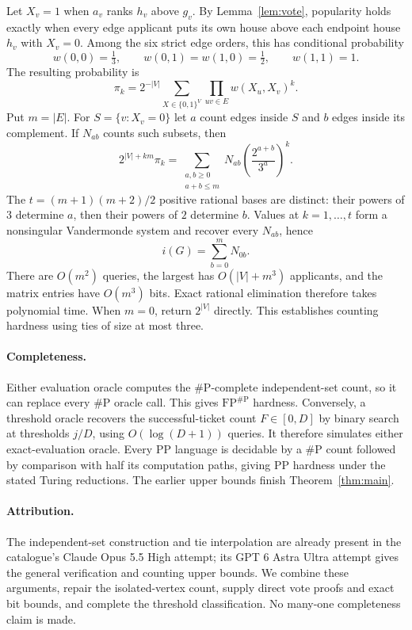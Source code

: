 \documentclass[11pt]{article}
\newcommand{\PP}{\mathrm{PP}}
\newcommand{\FP}{\mathrm{FP}}
\newcommand{\sharpP}{\#\mathrm P}
\begin{document}
Let $X_v=1$ when $a_v$ ranks $h_v$ above $g_v$. By Lemma~\ref{lem:vote}, popularity holds exactly when every edge applicant puts its own house above each endpoint house $h_v$ with $X_v=0$. Among the six strict edge orders, this has conditional probability
\[
 w(0,0)=\tfrac13,\qquad w(0,1)=w(1,0)=\tfrac12,
 \qquad w(1,1)=1.
\]
The resulting probability is
\begin{equation}\label{eq:spin}
 \pi_k=2^{-|V|}\sum_{X\in\{0,1\}^V}\prod_{uv\in E}w(X_u,X_v)^k.
\end{equation}
Put $m=|E|$. For $S=\{v:X_v=0\}$ let $a$ count edges inside $S$ and $b$ edges inside its complement. If $N_{ab}$ counts such subsets, then
\begin{equation}\label{eq:interp}
 2^{|V|+km}\pi_k
 =\sum_{\substack{a,b\geq0\\a+b\leq m}}
 N_{ab}\left(\frac{2^{a+b}}{3^a}\right)^k.
\end{equation}
The $t=(m+1)(m+2)/2$ positive rational bases are distinct: their powers of $3$ determine $a$, then their powers of $2$ determine $b$. Values at $k=1,\ldots,t$ form a nonsingular Vandermonde system and recover every $N_{ab}$, hence
\[
 i(G)=\sum_{b=0}^m N_{0b}.
\]
There are $O(m^2)$ queries, the largest has $O(|V|+m^3)$ applicants, and the matrix entries have $O(m^3)$ bits. Exact rational elimination therefore takes polynomial time. When $m=0$, return $2^{|V|}$ directly. This establishes counting hardness using ties of size at most three.

\paragraph{Completeness.}
Either evaluation oracle computes the $\sharpP$-complete independent-set count, so it can replace every $\sharpP$ oracle call. This gives $\FP^{\sharpP}$ hardness. Conversely, a threshold oracle recovers the successful-ticket count $F\in[0,D]$ by binary search at thresholds $j/D$, using $O(\log(D+1))$ queries. It therefore simulates either exact-evaluation oracle. Every $\PP$ language is decidable by a $\sharpP$ count followed by comparison with half its computation paths, giving $\PP$ hardness under the stated Turing reductions. The earlier upper bounds finish Theorem~\ref{thm:main}.

\paragraph{Attribution.}
The independent-set construction and tie interpolation are already present in the catalogue's Claude Opus 5.5 High attempt; its GPT 6 Astra Ultra attempt gives the general verification and counting upper bounds. We combine these arguments, repair the isolated-vertex count, supply direct vote proofs and exact bit bounds, and complete the threshold classification. No many-one completeness claim is made.
\end{document}
